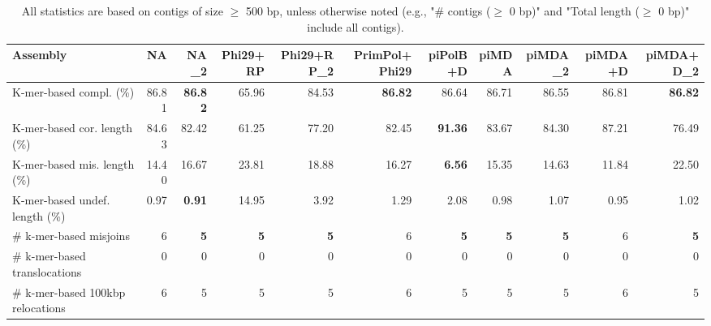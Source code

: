\documentclass[12pt,a4paper]{article}
\begin{document}
\begin{table}[ht]
\begin{center}
\caption{All statistics are based on contigs of size $\geq$ 500 bp, unless otherwise noted (e.g., "\# contigs ($\geq$ 0 bp)" and "Total length ($\geq$ 0 bp)" include all contigs).}
\begin{tabular}{|l*{10}{|r}|}
\hline
Assembly & NA & NA\_2 & Phi29+RP & Phi29+RP\_2 & PrimPol+Phi29 & piPolB+D & piMDA & piMDA\_2 & piMDA+D & piMDA+D\_2 \\ \hline
K-mer-based compl. (\%) & 86.81 & {\bf 86.82} & 65.96 & 84.53 & {\bf 86.82} & 86.64 & 86.71 & 86.55 & 86.81 & {\bf 86.82} \\ \hline
K-mer-based cor. length (\%) & 84.63 & 82.42 & 61.25 & 77.20 & 82.45 & {\bf 91.36} & 83.67 & 84.30 & 87.21 & 76.49 \\ \hline
K-mer-based mis. length (\%) & 14.40 & 16.67 & 23.81 & 18.88 & 16.27 & {\bf 6.56} & 15.35 & 14.63 & 11.84 & 22.50 \\ \hline
K-mer-based undef. length (\%) & 0.97 & {\bf 0.91} & 14.95 & 3.92 & 1.29 & 2.08 & 0.98 & 1.07 & 0.95 & 1.02 \\ \hline
\# k-mer-based misjoins & 6 & {\bf 5} & {\bf 5} & {\bf 5} & 6 & {\bf 5} & {\bf 5} & {\bf 5} & 6 & {\bf 5} \\ \hline
\hspace{5mm}\# k-mer-based translocations & 0 & 0 & 0 & 0 & 0 & 0 & 0 & 0 & 0 & 0 \\ \hline
\hspace{5mm}\# k-mer-based 100kbp relocations & 6 & 5 & 5 & 5 & 6 & 5 & 5 & 5 & 6 & 5 \\ \hline
\end{tabular}
\end{center}
\end{table}
\end{document}
